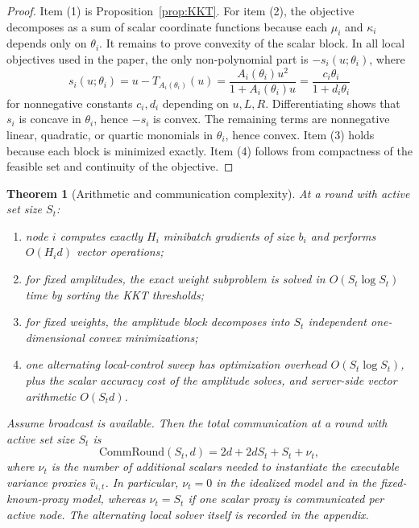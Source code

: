 \documentclass{article}
\newtheorem{theorem}{Theorem}[section]
\theoremstyle{definition}
\begin{document}
\begin{proof}
Item (1) is Proposition~\ref{prop:KKT}. For item (2), the objective decomposes
as a sum of scalar coordinate functions because each $\mu_i$ and $\kappa_i$
depends only on $\theta_i$. It remains to prove convexity of the scalar block.
In all local objectives used in the paper, the only non-polynomial part is
$-s_i(u;\theta_i)$, where
\[
s_i(u;\theta_i)=u-T_{A_i(\theta_i)}(u)
=\frac{A_i(\theta_i)u^2}{1+A_i(\theta_i)u}
=\frac{c_i\theta_i}{1+d_i\theta_i}
\]
for nonnegative constants $c_i,d_i$ depending on $u,L,R$. Differentiating
shows that $s_i$ is concave in $\theta_i$, hence $-s_i$ is convex. The
remaining terms are nonnegative linear, quadratic, or quartic monomials in
$\theta_i$, hence convex. Item (3) holds because each block is minimized
exactly. Item (4) follows from compactness of the feasible set and continuity
of the objective.
\end{proof}

\begin{theorem}[Arithmetic and communication complexity]
\label{th:complexity-main}
At a round with active set size $S_t$:
\begin{enumerate}[leftmargin=2em]
\item node $i$ computes exactly $H_i$ minibatch gradients of size $b_i$ and performs $O(H_i d)$ vector operations;
\item for fixed amplitudes, the exact weight subproblem is solved in $O(S_t\log S_t)$ time by sorting the KKT thresholds;
\item for fixed weights, the amplitude block decomposes into $S_t$ independent one-dimensional convex minimizations;
\item one alternating local-control sweep has optimization overhead $O(S_t\log S_t)$, plus the scalar accuracy cost of the amplitude solves, and server-side vector arithmetic $O(S_t d)$.
\end{enumerate}
Assume broadcast is available. Then the total communication at a round with
active set size $S_t$ is
\begin{equation}
\mathrm{CommRound}(S_t,d)=2d+2dS_t+S_t+\nu_t,
\label{eq:comm-main}\end{equation}
where $\nu_t$ is the number of additional scalars needed to instantiate the
executable variance proxies $\widehat v_{i,t}$. In particular,
$\nu_t=0$ in the idealized model and in the fixed-known-proxy model, whereas
$\nu_t=S_t$ if one scalar proxy is communicated per active node.
The alternating local solver itself is recorded in the appendix.
\end{theorem}
\end{document}
